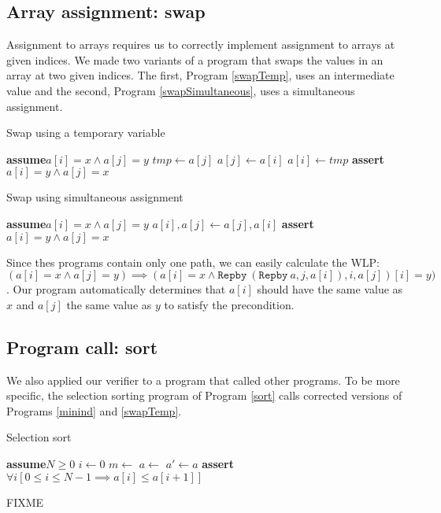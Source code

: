 \documentclass[a4paper]{article}
\newcommand{\Assert}{\State\textbf{assert}\xspace}
\newcommand{\Assume}{\State\textbf{assume}\xspace}
\begin{document}
\subsection{Array assignment: swap}

Assignment to arrays requires us to correctly implement assignment to arrays at given indices. We made two variants of a program that swaps the values in an array at two given indices. The first, Program \ref{swapTemp}, uses an intermediate value and the second, Program \ref{swapSimultaneous}, uses a simultaneous assignment.

\begin{algorithm}
\caption{Swap using a temporary variable} \label{swapTemp}
\begin{algorithmic}
\Assume $a[i] = x \wedge a[j] = y$
\State $\textit{tmp} \gets a[j]$
\State $a[j] \gets a[i]$
\State $a[i] \gets \textit{tmp}$
\EndVar
\Assert $a[i] = y \wedge a[j] = x$
\end{algorithmic}
\end{algorithm}

\begin{algorithm}
\caption{Swap using simultaneous assignment}
\label{swapSimultaneous}
\begin{algorithmic}
\Assume $a[i] = x \wedge a[j] = y$
\State $a[i], a[j] \gets a[j], a[i]$
\Assert $a[i] = y \wedge a[j] = x$
\end{algorithmic}
\end{algorithm}

Since thes programs contain only one path, we can easily calculate the WLP: $(a[i] = x \wedge a[j] = y) \implies (a[i] = x \wedge \texttt{Repby}\ (\texttt{Repby}\ a, j, a[i]), i, a[j])[i] = y)$. Our program automatically determines that $a[i]$ should have the same value as $x$ and $a[j]$ the same value as $y$ to satisfy the precondition.

\subsection{Program call: sort}

We also applied our verifier to a program that called other programs. To be more specific, the selection sorting program of Program \ref{sort} calls corrected versions of Programs \ref{minind} and \ref{swapTemp}.

\begin{algorithm}
\caption{Selection sort}
\label{sort}
\begin{algorithmic}
\Assume $N \geq 0$
	\State $i \gets 0$
		\State $m \gets $
			\State $a \gets $
		\EndIf
	\EndWhile
\EndVar
\State $a' \gets a$
\Assert $\forall i [0 \leq i \leq N-1 \implies a[i] \leq a[i+1]]$
\end{algorithmic}
\end{algorithm}
FIXME
\end{document}
